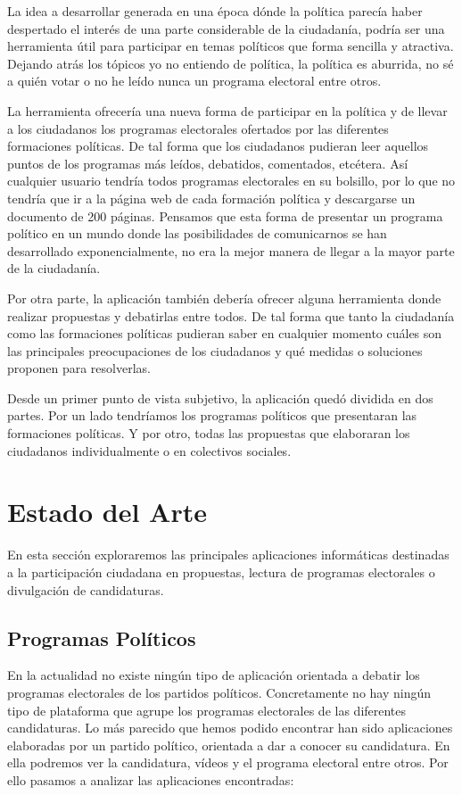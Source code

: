 La idea a desarrollar generada en una época dónde la política parecía haber despertado el interés de una parte considerable de la ciudadanía, podría ser una herramienta útil para participar en temas políticos que forma sencilla y atractiva. Dejando atrás los tópicos yo no entiendo de política, la política es aburrida, no sé a quién votar o no he leído nunca un programa electoral entre otros.

La herramienta ofrecería una nueva forma de participar en la política y de llevar a los ciudadanos los programas electorales ofertados por las diferentes formaciones políticas. De tal forma que los ciudadanos pudieran leer aquellos puntos de los programas más leídos, debatidos, comentados, etcétera. Así cualquier usuario tendría todos programas electorales en su bolsillo, por lo que no tendría que ir a la página web de cada formación política y descargarse un documento de 200 páginas. Pensamos que esta forma de presentar un programa político en un mundo donde las posibilidades de  comunicarnos se han desarrollado exponencialmente, no era la mejor manera de llegar a la mayor parte de la ciudadanía.

Por otra parte, la aplicación también debería ofrecer alguna herramienta donde realizar propuestas y debatirlas entre todos. De tal forma que tanto la ciudadanía como las formaciones políticas pudieran saber en cualquier momento cuáles son las principales preocupaciones de los ciudadanos y qué medidas o soluciones proponen para resolverlas.

Desde un primer punto de vista subjetivo, la aplicación quedó dividida en dos partes. Por un lado tendríamos los programas políticos que presentaran las formaciones políticas. Y por otro, todas las propuestas que elaboraran los ciudadanos individualmente o en colectivos sociales.

\section{Estado del Arte}

En esta sección exploraremos las principales aplicaciones informáticas destinadas a la participación ciudadana en propuestas, lectura de programas electorales o divulgación de candidaturas.

\subsection{Programas Políticos}

En la actualidad no existe ningún tipo de aplicación orientada a debatir los programas electorales de los partidos políticos. Concretamente no hay ningún tipo de plataforma que agrupe los programas electorales de las diferentes candidaturas.
Lo más parecido que hemos podido encontrar han sido aplicaciones elaboradas por un partido político, orientada a dar a conocer su candidatura. En ella podremos ver la candidatura, vídeos y el programa electoral entre otros. Por ello pasamos a analizar las aplicaciones encontradas:

